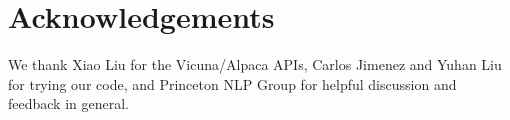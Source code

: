 \section*{Acknowledgements}
We thank Xiao Liu for the Vicuna/Alpaca APIs, Carlos Jimenez and Yuhan Liu for trying our code, and Princeton NLP Group for helpful discussion and feedback in general. 
\label{sec:acknowledgements}